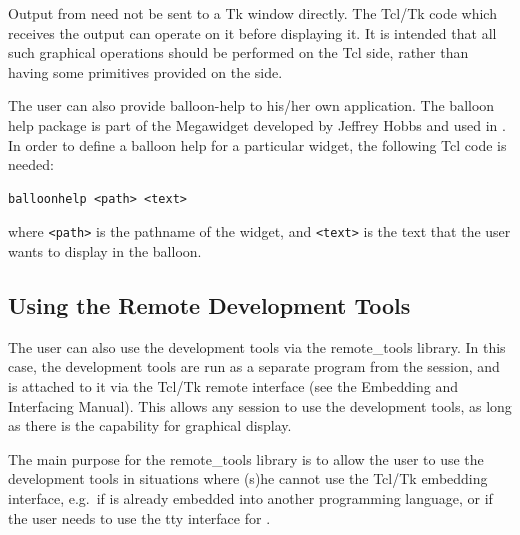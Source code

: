 Output from {\eclipse} need not be sent to a Tk window directly. The Tcl/Tk
code which receives the output can operate on it before displaying it. It
is intended that all such graphical operations should be performed on the
Tcl side, rather than having some primitives provided on the {\eclipse} side.


The user can also provide balloon-help to his/her own application. The
balloon help package is part of the Megawidget developed by Jeffrey Hobbs
and used in {\tkeclipse}. In order to define a balloon help for a particular
widget, the following Tcl code is needed:

\begin{verbatim}
balloonhelp <path> <text>
\end{verbatim}

\noindent
where \verb'<path>' is the pathname of the widget, and \verb'<text>' is the
text that the user wants to display in the balloon. 


\subsection{Using the Remote Development Tools}
\label{useremotetools}

The user can also use the development tools via the remote_tools
library. In this case, the development tools are run as a separate program
from the {\eclipse} session, and is attached to it via the Tcl/Tk remote
interface (see the Embedding and Interfacing Manual). This allows any 
{\eclipse} session to use the development tools,
as long as there is the capability for graphical display. 

The main purpose for the remote_tools library is to allow the user to 
use the development tools in situations where (s)he cannot use the Tcl/Tk
embedding interface, e.g.\ if {\eclipse} is already embedded into another
programming language, or if the user needs to use the tty interface for
{\eclipse}. 

